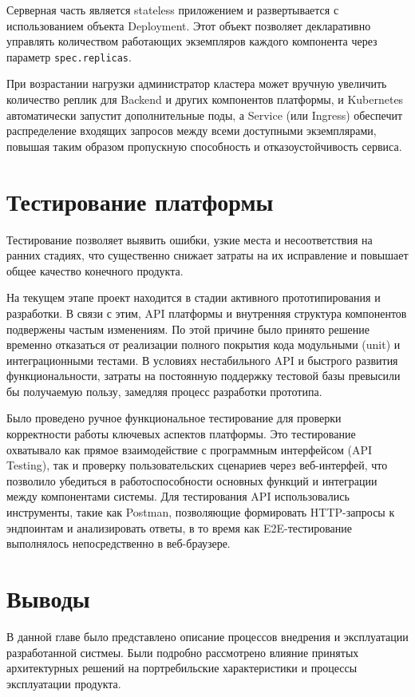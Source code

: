 Серверная часть является stateless приложением и развертывается с использованием объекта Deployment. 
Этот объект позволяет декларативно управлять количеством работающих экземпляров каждого компонента через параметр \texttt{spec.replicas}.

При возрастании нагрузки администратор кластера может вручную увеличить количество реплик для Backend и других компонентов платформы, и Kubernetes автоматически запустит дополнительные поды, а Service (или Ingress) обеспечит распределение входящих запросов между всеми доступными экземплярами, повышая таким образом пропускную способность и отказоустойчивость сервиса.

\section{Тестирование платформы}

Тестирование позволяет выявить ошибки, узкие места и несоответствия на ранних стадиях, что существенно снижает затраты на их исправление и повышает общее качество конечного продукта. 

На текущем этапе проект находится в стадии активного прототипирования и разработки. В связи с этим, API платформы и внутренняя структура компонентов подвержены частым изменениям. По этой причине было принято решение временно отказаться от реализации полного покрытия кода модульными (unit) и интеграционными тестами. В условиях нестабильного API и быстрого развития функциональности, затраты на постоянную поддержку тестовой базы превысили бы получаемую пользу, замедляя процесс разработки прототипа. 

Было проведено ручное функциональное тестирование для проверки корректности работы ключевых аспектов платформы. Это тестирование охватывало как прямое взаимодействие с программным интерфейсом (API Testing), так и проверку пользовательских сценариев через веб-интерфей, что позволило убедиться в работоспособности основных функций и интеграции между компонентами системы. Для тестирования API использовались инструменты, такие как Postman, позволяющие формировать HTTP-запросы к эндпоинтам и анализировать ответы, в то время как E2E-тестирование выполнялось непосредственно в веб-браузере.

\section{Выводы}

В данной главе было представлено описание процессов внедрения и эксплуатации разработанной систмеы. Были подробно рассмотрено влияние принятых архитектурных решений на портребильские характеристики и процессы эксплуатации продукта.

